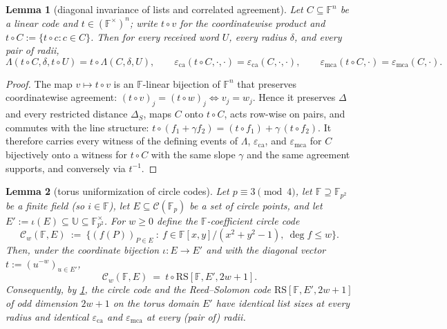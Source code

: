 \documentclass[11pt]{article}
\newtheorem{lemma}[lemma]{Lemma}
\theoremstyle{definition}
\theoremstyle{remark}
\newcommand{\F}{\mathbb{F}}
\newcommand{\RS}{\mathrm{RS}}
\newcommand{\eca}{\varepsilon_{\mathrm{ca}}}
\newcommand{\emca}{\varepsilon_{\mathrm{mca}}}
\newcommand{\dist}{\Delta}
\newcommand{\distS}{\Delta_S}
\newcommand{\Lst}{\Lambda}
\newcommand{\UU}{\mathbb{U}}
\begin{document}
\begin{lemma}[diagonal invariance of lists and correlated agreement]\label{lem:diag-invariance}
Let $C\subseteq\F^n$ be a linear code and $t\in(\F^{\times})^n$; write $t\circ v$ for the coordinatewise product and $t\circ C:=\{t\circ c:c\in C\}$. Then for every received word $U$, every radius $\delta$, and every pair of radii,
\[
\Lst(t\circ C,\delta,t\circ U)=t\circ\Lst(C,\delta,U),
\qquad
\eca(t\circ C,\cdot,\cdot)=\eca(C,\cdot,\cdot),
\qquad
\emca(t\circ C,\cdot)=\emca(C,\cdot).
\]
\end{lemma}

\begin{proof}
The map $v\mapsto t\circ v$ is an $\F$-linear bijection of $\F^n$ that preserves coordinatewise agreement: $(t\circ v)_j=(t\circ w)_j\iff v_j=w_j$. Hence it preserves $\dist$ and every restricted distance $\distS$, maps $C$ onto $t\circ C$, acts row-wise on pairs, and commutes with the line structure: $t\circ(f_1+\gamma f_2)=(t\circ f_1)+\gamma\,(t\circ f_2)$. It therefore carries every witness of the defining events of $\Lst$, $\eca$, and $\emca$ for $C$ bijectively onto a witness for $t\circ C$ with the same slope $\gamma$ and the same agreement supports, and conversely via $t^{-1}$.
\end{proof}

\begin{lemma}[torus uniformization of circle codes]\label{lem:circle-rs}
Let $p\equiv3\pmod4$, let $\F\supseteq\F_{p^2}$ be a finite field \textup(so $i\in\F$\textup), let $E\subseteq\mathcal C(\F_p)$ be a set of circle points, and let $E':=\iota(E)\subseteq\UU\subseteq\F_{p^2}^{\times}$. For $w\ge0$ define the $\F$-coefficient circle code
\[
\mathcal C_w(\F,E)\ :=\ \bigl\{(f(P))_{P\in E}\ :\ f\in\F[x,y]/(x^2+y^2-1),\ \deg f\le w\bigr\}.
\]
Then, under the coordinate bijection $\iota:E\to E'$ and with the diagonal vector $t:=(u^{-w})_{u\in E'}$,
\[
\mathcal C_w(\F,E)\ =\ t\circ\RS[\F,E',2w+1].
\]
Consequently, by \cref{lem:diag-invariance}, the circle code and the Reed--Solomon code $\RS[\F,E',2w+1]$ of odd dimension $2w+1$ on the torus domain $E'$ have identical list sizes at every radius and identical $\eca$ and $\emca$ at every (pair of) radii.
\end{lemma}
\end{document}
